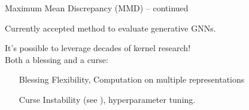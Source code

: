\documentclass[aspectratio=169, 10pt, dvipsnames]{beamer}
\begin{document}
\begin{frame}[fragile]{Maximum Mean Discrepancy (MMD) -- continued}
  \begin{minipage}{0.68\textwidth}
  \pause\small Currently accepted method to evaluate generative GNNs.
  \pause\begin{figure}
    \centering
  \end{figure}
    \pause\small It's possible to leverage decades of kernel research!\\
    \pause Both a
    \textcolor{PineGreen}{blessing} and a \textcolor{YellowOrange}{curse}:
    \begin{itemize}
      \pause\item[\textcolor{PineGreen}{Blessing}] Flexibility, Computation on
      multiple representations
      \pause\item[\textcolor{YellowOrange}{Curse}] Instability (see \citet{o2021evaluation}), hyperparameter tuning.
    \end{itemize}


\end{minipage}
\end{frame}
\end{document}
